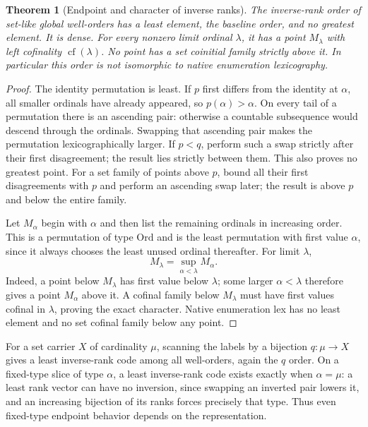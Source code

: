 \documentclass[11pt]{article}
\newtheorem{theorem}{Theorem}[section]
\theoremstyle{definition}
\theoremstyle{remark}
\newcommand{\Ord}{\mathrm{Ord}}
\newcommand{\cf}{\operatorname{cf}}
\begin{document}
\begin{theorem}[Endpoint and character of inverse ranks]\label{swo:cb:thm:inverserank}
The inverse-rank order of set-like global well-orders has a least element,
the baseline order, and no greatest element. It is dense. For every nonzero
limit ordinal $\lambda$, it has a point $M_\lambda$ with left cofinality
$\cf(\lambda)$. No point has a set coinitial family strictly above it.
In particular this order is not isomorphic to native enumeration lexicography.
\end{theorem}
\begin{proof}
The identity permutation is least. If $p$ first differs from the identity
at $\alpha$, all smaller ordinals have already appeared, so
$p(\alpha)>\alpha$. On every tail of a permutation there is an ascending
pair: otherwise a countable subsequence would descend through the ordinals.
Swapping that ascending pair makes the permutation lexicographically larger.
If $p<q$, perform such a swap strictly after their first disagreement;
the result lies strictly between them. This also proves no greatest point.
For a set family of points above $p$, bound all their first disagreements
with $p$ and perform an ascending swap later; the result is above $p$ and
below the entire family.

Let $M_\alpha$ begin with $\alpha$ and then list the remaining ordinals
in increasing order. This is a permutation of type $\Ord$ and is the
least permutation with first value $\alpha$, since it always chooses
the least unused ordinal thereafter. For limit $\lambda$,
\[
 M_\lambda=\sup_{\alpha<\lambda}M_\alpha.
\]
Indeed, a point below $M_\lambda$ has first value below $\lambda$;
some larger $\alpha<\lambda$ therefore gives a point $M_\alpha$
above it. A cofinal family below $M_\lambda$ must have first values
cofinal in $\lambda$, proving the exact character. Native enumeration
lex has no least element and no set cofinal family below any point.
\end{proof}

For a set carrier $X$ of cardinality $\mu$, scanning the labels by a
bijection $q:\mu\to X$ gives a least inverse-rank code among all
well-orders, again the $q$ order. On a fixed-type slice of type $\alpha$,
a least inverse-rank code exists exactly when $\alpha=\mu$: a least
rank vector can have no inversion, since swapping an inverted pair lowers
it, and an increasing bijection of its ranks forces precisely that type.
Thus even fixed-type endpoint behavior depends on the representation.
\end{document}

